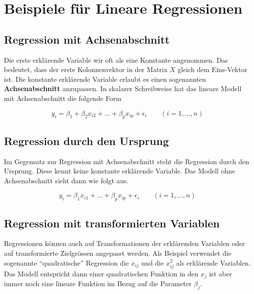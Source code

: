 \documentclass[]{book}
\begin{document}
\section{Beispiele für Lineare
Regressionen}\label{beispiele-fur-lineare-regressionen}

\subsection{Regression mit
Achsenabschnitt}\label{regression-mit-achsenabschnitt}

Die erste erklärende Variable wir oft als eine Konstante angenommen. Das
bedeutet, dass der erste Kolonnenvektor in der Matrix \(X\) gleich dem
Eins-Vektor ist. Die konstante erklärende Variable erlaubt es einen
sogenannten \textbf{Achsenabschnitt} anzupassen. In skalarer
Schreibweise hat das lineare Modell mit Achsenabschnitt die folgende
Form

\begin{equation}y_i = \beta_1 + \beta_2x_{i2} + \ldots + \beta_px_{ip} + \epsilon_i \qquad (i = 1,\ldots,n)\end{equation}

\subsection{Regression durch den
Ursprung}\label{regression-durch-den-ursprung}

Im Gegensatz zur Regression mit Achsenabschnitt steht die Regression
durch den Ursprung. Diese kennt keine konstante erklärende Variable. Das
Modell ohne Achsenabschnitt sieht dann wie folgt aus.

\begin{equation}y_i = \beta_1x_{i1}+ \ldots + \beta_px_{ip} + \epsilon_i \qquad (i = 1,\ldots,n)\end{equation}

\subsection{Regression mit transformierten
Variablen}\label{regression-mit-transformierten-variablen}

Regressionen können auch auf Transformationen der erklärenden Variablen
oder auf transformierte Zielgrössen angepasst werden. Als Beispiel
verwendet die sogenannte ``quadratische'' Regression die \(x_{ij}\) und
die \(x_{ij}^2\) als erklärende Variablen. Das Modell entspricht dann
einer quadratischen Funktion in den \(x_j\) ist aber immer noch eine
lineare Funktion im Bezug auf die Parameter \(\beta_j\).
\end{document}
